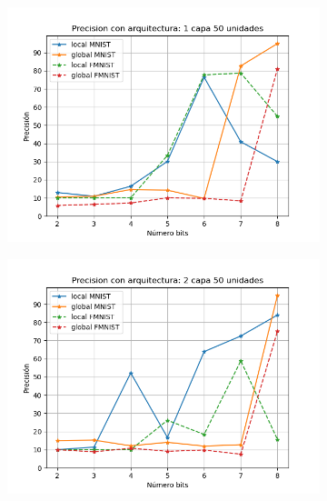 \begin{figure}[H]
\begin{subfigure}[H]{0.45\textwidth}
    \end{subfigure}
    \begin{subfigure}[H]{0.45\textwidth}
    \includegraphics[width=\textwidth]{imagenes/backprop/Precision con arquitectura: 1 capa 50 unidades.png}
    \end{subfigure}
    \begin{subfigure}[H]{0.45\textwidth}
    \includegraphics[width=\textwidth]{imagenes/backprop/Precision con arquitectura: 2 capa 50 unidades.png}
    \end{subfigure}
    \begin{subfigure}[H]{0.45\textwidth}

\end{subfigure}
\end{figure}
